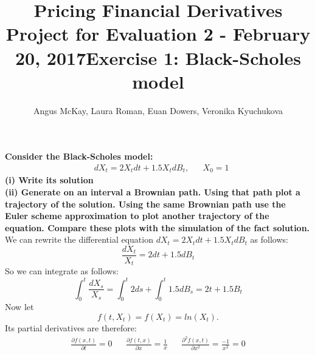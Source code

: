 \documentclass[12pt]{article}
\begin{document}
\title{Pricing Financial Derivatives   \\ Project for Evaluation 2 - February 20, 2017}
\author{Angus McKay, Laura Roman, Euan Dowers, Veronika Kyuchukova}
\date{}
\maketitle

\title {{\bf Exercise 1:} {\bf Black-Scholes model }}
{\bf Consider the Black-Scholes model:}
\begin{align*}
& dX_t = 2X_t dt + 1.5X_tdB_t, && X_0=1
\end{align*}
{\bf (i) Write its solution \\
(ii) Generate on an interval a Brownian path. Using that path plot a trajectory of the solution. Using the same Brownian path use the Euler scheme approximation to plot another trajectory of the equation. Compare these plots with the simulation of the fact solution.} \\

We can rewrite the differential equation $dX_t = 2X_t dt + 1.5X_tdB_t$ as follows:
\begin{equation}
\frac{dX_t}{X_t} = 2dt + 1.5dB_t
\end{equation}
So we can integrate as follows:
\begin{equation} \label{uno}
\int_0^t \frac{dX_s}{X_s} = \int_0^t2ds + \int_0^t 1.5dB_s = 2t + 1.5B_t
\end{equation}
Now let
\begin{equation}
f(t,X_t)= f(X_t)= ln(X_t).
\end{equation}
Its partial derivatives are therefore:
\begin{align}
 \frac{\partial f(x,t)}{\partial t}= 0 &&
 \frac{\partial f(t,x)}{\partial x} = \frac{1}{x}&&
 \frac{\partial^2f(x,t)}{\partial x^2} = \frac{-1}{x^2}  = 0 
\end{align}
\end{document}
